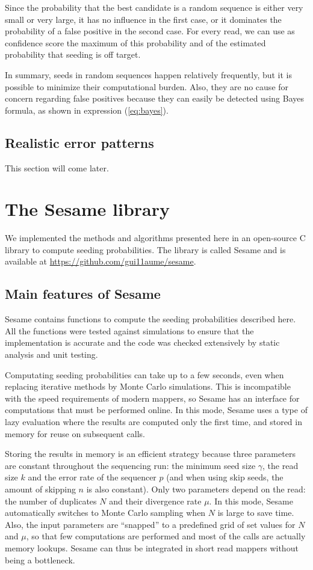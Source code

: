 \documentclass{article}
\begin{document}
Since the probability that the best candidate is a random sequence is
either very small or very large, it has no influence in the first case,
or it dominates the probability of a false positive in the second case.
For every read, we can use as confidence score the maximum of this
probability and of the estimated probability that seeding is off target.

In summary, seeds in random sequences happen relatively frequently, but it
is possible to minimize their computational burden. Also, they are no
cause for concern regarding false positives because they can easily be
detected using Bayes formula, as shown in expression (\ref{eq:bayes}).


\subsection{Realistic error patterns}

This section will come later.



\section{The Sesame library}
\label{sec:sesame}

We implemented the methods and algorithms presented here in an open-source
C library to compute seeding probabilities. The library is called Sesame
and is available at \url{https://github.com/gui11aume/sesame}.

\subsection{Main features of Sesame}

Sesame contains functions to compute the seeding probabilities described
here. All the functions were tested against simulations to ensure that the
implementation is accurate and the code was checked extensively by static
analysis and unit testing.

Computating seeding probabilities can take up to a few seconds, even when
replacing iterative methods by Monte Carlo simulations. This is
incompatible with the speed requirements of modern mappers, so Sesame has
an interface for computations that must be performed online. In this mode,
Sesame uses a type of lazy evaluation where the results are computed only
the first time, and stored in memory for reuse on subsequent calls.

Storing the results in memory is an efficient strategy because three
parameters are constant throughout the sequencing run: the minimum seed
size $\gamma$, the read size $k$ and the error rate of the sequencer $p$
(and when using skip seeds, the amount of skipping $n$ is also constant).
Only two parameters depend on the read: the number of duplicates $N$ and
their divergence rate $\mu$. In this mode, Sesame automatically switches
to Monte Carlo sampling when $N$ is large to save time. Also, the input
parameters are ``snapped'' to a predefined grid of set values for $N$ and
$\mu$, so that few computations are performed and most of the calls are
actually memory lookups. Sesame can thus be integrated in short read
mappers without being a bottleneck.
\end{document}
